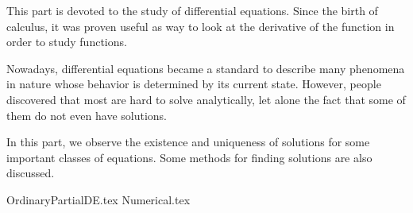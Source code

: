 \label{part:diffeq}

This part is devoted to the study of differential equations.
Since the birth of calculus,
it was proven useful as way to look at the derivative of the function
in order to study functions.

Nowadays, differential equations became a standard
to describe many phenomena in nature
whose behavior is determined by its current state.
However, people discovered that most are hard to solve analytically,
let alone the fact that some of them do not even have solutions.

In this part,
we observe the existence and uniqueness of solutions
for some important classes of equations.
Some methods for finding solutions are also discussed.

{OrdinaryPartialDE.tex}
{Numerical.tex}
